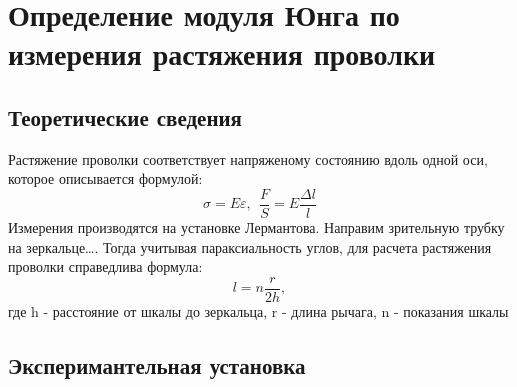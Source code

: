 \documentclass[a4paper,12pt]{article} %
\begin{document}
\section{Определение модуля Юнга по измерения растяжения проволки}
\subsection{Теоретические сведения}
Растяжение проволки соответствует напряженому состоянию вдоль одной оси, которое описывается формулой:
\begin{equation}
    \sigma = E \varepsilon, \ \ 
    \frac{F}{S} = E \frac{\Delta l}{l}
    \label{lermantov}
\end{equation}
Измерения производятся на установке Лермантова.
Направим зрительную трубку на зеркальце\dots.
Тогда учитывая параксиальность углов,
для расчета растяжения проволки справедлива формула:
\begin{equation}
    l = n\frac{r}{2h},
    \label{dlina}
\end{equation}
где h - расстояние от шкалы до зеркальца,
r - длина рычага, n - показания шкалы\\

\subsection{Эксперимантельная установка}
\end{document}

